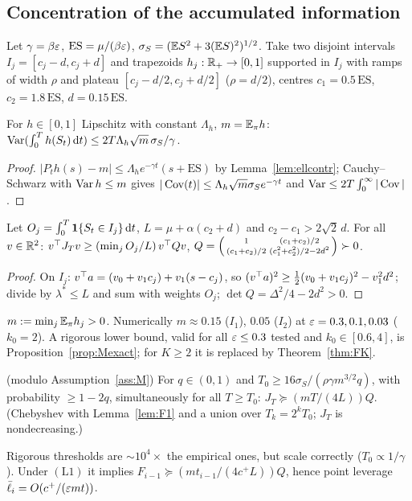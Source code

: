 \subsection{Concentration of the accumulated information}

Let $\gamma=\beta\varepsilon$, $\mathrm{ES}=\mu/(\beta\varepsilon)$, $\sigma_S=(\mathbb{E} S^2+3(\mathbb{E} S)^2)^{1/2}$. Take two disjoint intervals $I_j=[c_j-d,c_j+d]$ and trapezoids $h_j:\mathbb{R}_+\to[0,1]$ supported in $I_j$ with ramps of width $\rho$ and plateau $[c_j-d/2,c_j+d/2]$ ($\rho=d/2$), centres $c_1=0.5\,\mathrm{ES}$, $c_2=1.8\,\mathrm{ES}$, $d=0.15\,\mathrm{ES}$.

\begin{lemma}\label{lem:F1}\Pt{}
For $h\in[0,1]$ Lipschitz with constant $\Lambda_h$, $m=\mathbb{E}_\pi h$: $\operatorname{Var}(\int_0^Th(S_t)\,\mathrm d t)\le2T\Lambda_h\sqrt m\,\sigma_S/\gamma$.
\end{lemma}
\begin{proof}
$|P_th(s)-m|\le\Lambda_he^{-\gamma t}(s+\mathrm{ES})$ by Lemma~\ref{lem:ellcontr}; Cauchy--Schwarz with $\operatorname{Var} h\le m$ gives $|\operatorname{Cov}(t)|\le\Lambda_h\sqrt m\sigma_Se^{-\gamma t}$ and $\operatorname{Var}\le2T\int_0^\infty|\operatorname{Cov}|$.
\end{proof}

\begin{lemma}\label{lem:F2}\Pt{}
Let $O_j=\int_0^T\mathbf 1\{S_t\in I_j\}\,\mathrm d t$, $L=\mu+\alpha(c_2+d)$ and $c_2-c_1>2\sqrt2\,d$. For all $v\in\mathbb{R}^2$:
$v^{\top} J_Tv\ge(\min_jO_j/L)\,v^{\top} Qv$, $Q=\begin{psmallmatrix}1&(c_1+c_2)/2\\(c_1+c_2)/2&(c_1^2+c_2^2)/2-2d^2\end{psmallmatrix}\succ0$.
\end{lemma}
\begin{proof}
On $I_j$: $v^{\top} a=(v_0+v_1c_j)+v_1(s-c_j)$, so $(v^{\top} a)^2\ge\frac12(v_0+v_1c_j)^2-v_1^2d^2$; divide by $\lambda^*\le L$ and sum with weights $O_j$; $\det Q=\Delta^2/4-2d^2>0$.
\end{proof}

\begin{assumption}[M]\label{ass:M}
$m:=\min_j\mathbb{E}_\pi h_j>0$. Numerically $m\approx0.15$ ($I_1$), $0.05$ ($I_2$) at $\varepsilon=0.3,0.1,0.03$ ($k_0=2$). A rigorous lower bound, valid for all $\varepsilon\le0.3$ tested and $k_0\in[0.6,4]$, is Proposition~\ref{prop:Mexact}; for $K\ge2$ it is replaced by Theorem~\ref{thm:FK}.
\end{assumption}

\begin{theorem}\label{thm:Fconc}\Ps{} (modulo Assumption~\ref{ass:M})
For $q\in(0,1)$ and $T_0\ge16\sigma_S/(\rho\gamma m^{3/2}q)$, with probability $\ge1-2q$, simultaneously for all $T\ge T_0$: $J_T\succeq(mT/(4L))Q$. (Chebyshev with Lemma~\ref{lem:F1} and a union over $T_k=2^kT_0$; $J_T$ is nondecreasing.)
\end{theorem}
Rigorous thresholds are $\sim10^4\times$ the empirical ones, but scale correctly ($T_0\propto1/\gamma$). Under $\mathrm{(L1)}$ it implies $F_{i-1}\succeq(mt_{i-1}/(4c^+L))Q$, hence point leverage $\bar\ell_i=O(c^+/(\varepsilon mt))$.

